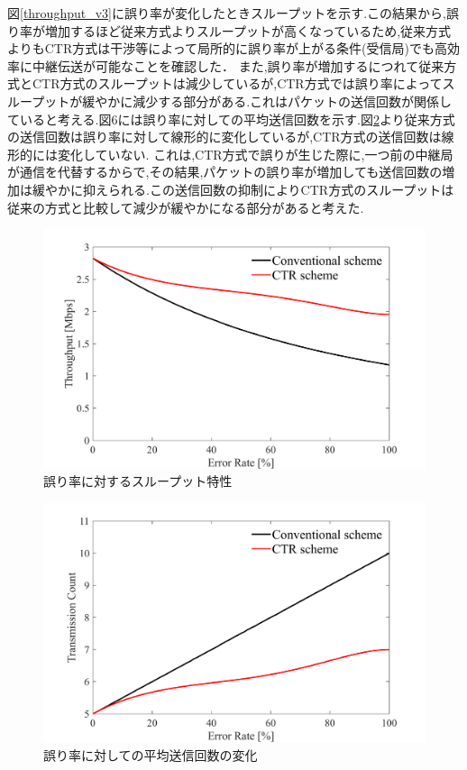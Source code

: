 \documentclass[a4paper,10.5pt]{ltjsarticle}
\begin{document}
図\ref{throughput_v3}に誤り率が変化したときスループットを示す.この結果から,誤り率が増加するほど従来方式よりスループットが高くなっているため,従来方式よりもCTR方式は干渉等によって局所的に誤り率が上がる条件(受信局)でも高効率に中継伝送が可能なことを確認した．
また,誤り率が増加するにつれて従来方式とCTR方式のスループットは減少しているが,CTR方式では誤り率によってスループットが緩やかに減少する部分がある.これはパケットの送信回数が関係していると考える.図6には誤り率に対しての平均送信回数を示す.図\ref{fig:throughput_v3.1}より従来方式の送信回数は誤り率に対して線形的に変化しているが,CTR方式の送信回数は線形的には変化していない.
これは,CTR方式で誤りが生じた際に,一つ前の中継局が通信を代替するからで,その結果,パケットの誤り率が増加しても送信回数の増加は緩やかに抑えられる.この送信回数の抑制によりCTR方式のスループットは従来の方式と比較して減少が緩やかになる部分があると考えた.

\begin{figure}[H]
  \centering
  \includegraphics[width=\linewidth]{throughput_probabilistic_retry_v3.pdf} %
  \caption{誤り率に対するスループット特性}
  \label{fig:throughput_v3} %
\end{figure}
\begin{figure}[H]
  \centering
  \includegraphics[width=\linewidth]{throughput_probabilistic_retry_v3.1.pdf} %
  \caption{誤り率に対しての平均送信回数の変化}
  \label{fig:throughput_v3.1} %
\end{figure}
\clearpage
\end{document}
